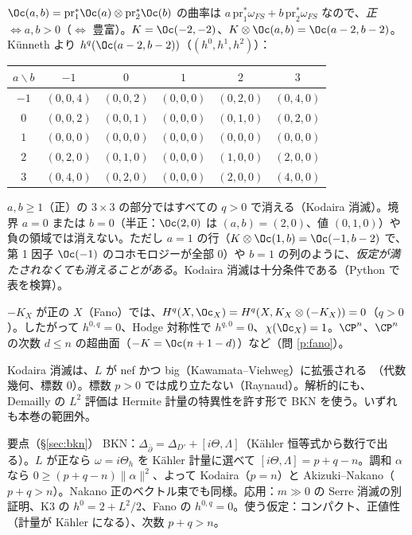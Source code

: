 \begin{ex}\label{ex:P1P1}
$\Oc(a,b)=\mathrm{pr}_1^*\Oc(a)\otimes\mathrm{pr}_2^*\Oc(b)$ の曲率は $a\,\mathrm{pr}_1^*\omega_{FS}+b\,\mathrm{pr}_2^*\omega_{FS}$ なので、\emph{正 $\iff a,b>0$}（$\iff$ 豊富）。$K=\Oc(-2,-2)$、$K\otimes\Oc(a,b)=\Oc(a-2,b-2)$。Künneth より $h^q(\Oc(a-2,b-2))$（$(h^0,h^1,h^2)$）：
\begin{center}\small
\begin{tabular}{c|ccccc}
$a\backslash b$ & $-1$ & $0$ & $1$ & $2$ & $3$\\\hline
$-1$ & $(0,0,4)$ & $(0,0,2)$ & $(0,0,0)$ & $(0,2,0)$ & $(0,4,0)$\\
$0$ & $(0,0,2)$ & $(0,0,1)$ & $(0,0,0)$ & $(0,1,0)$ & $(0,2,0)$\\
$1$ & $(0,0,0)$ & $(0,0,0)$ & $(0,0,0)$ & $(0,0,0)$ & $(0,0,0)$\\
$2$ & $(0,2,0)$ & $(0,1,0)$ & $(0,0,0)$ & $(1,0,0)$ & $(2,0,0)$\\
$3$ & $(0,4,0)$ & $(0,2,0)$ & $(0,0,0)$ & $(2,0,0)$ & $(4,0,0)$
\end{tabular}
\end{center}
$a,b\ge1$（正）の $3\times3$ の部分ではすべての $q>0$ で消える（Kodaira 消滅）。境界 $a=0$ または $b=0$（半正：$\Oc(2,0)$ は $(a,b)=(2,0)$、値 $(0,1,0)$）や負の領域では消えない。ただし $a=1$ の行（$K\otimes\Oc(1,b)=\Oc(-1,b-2)$ で、第 1 因子 $\Oc(-1)$ のコホモロジーが全部 $0$）や $b=1$ の列のように、\emph{仮定が満たされなくても消えることがある}。Kodaira 消滅は十分条件である（Python で表を検算）。
\end{ex}

\begin{ex}
$-K_X$ が正の $X$（Fano）では、$H^q(X,\Oc_X)=H^q(X,K_X\otimes(-K_X))=0$（$q>0$）。したがって $h^{0,q}=0$、Hodge 対称性で $h^{q,0}=0$、$\chi(\Oc_X)=1$。$\CP^n$、$\CP^n$ の次数 $d\le n$ の超曲面（$-K=\Oc(n+1-d)$）など（問 \ref{p:fano}）。
\end{ex}
\begin{rem}[一般化]
Kodaira 消滅は、$L$ が nef かつ big（Kawamata--Viehweg）に拡張される\tC\ （代数幾何、標数 0）。標数 $p>0$ では成り立たない（Raynaud）\tC。解析的にも、Demailly の $L^2$ 評価は Hermite 計量の特異性を許す形で BKN を使う。いずれも本巻の範囲外。
\end{rem}

\begin{keybox}{要点（\S\ref{sec:bkn}）}
BKN：$\Delta_{\bar\partial}=\Delta_{D'}+[i\Theta,\Lambda]$（Kähler 恒等式から数行で出る）。$L$ が正なら $\omega=i\Theta_h$ を Kähler 計量に選べて $[i\Theta,\Lambda]=p+q-n$。調和 $\alpha$ なら $0\ge(p+q-n)\|\alpha\|^2$、よって Kodaira（$p=n$）と Akizuki--Nakano（$p+q>n$）。Nakano 正のベクトル束でも同様。応用：$m\gg0$ の Serre 消滅の別証明、K3 の $h^0=2+L^2/2$、Fano の $h^{0,q}=0$。使う仮定：コンパクト、正値性（計量が Kähler になる）、次数 $p+q>n$。
\end{keybox}

